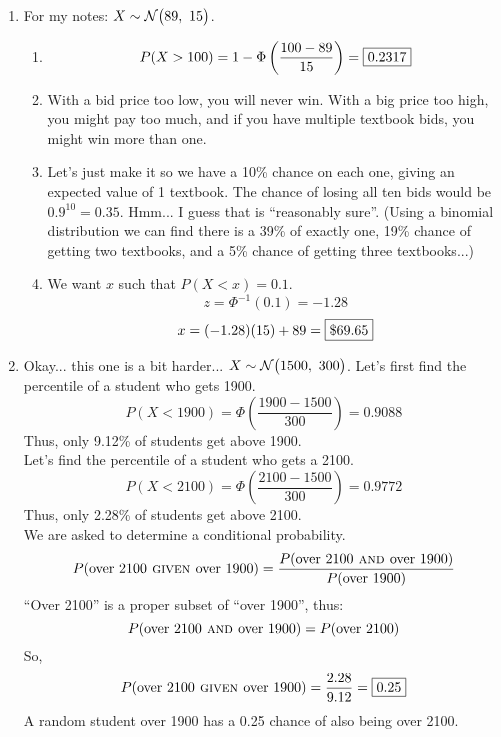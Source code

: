\documentclass[12pt,letterpaper]{article}
\begin{document}
\begin{enumerate}
\item For my notes: $X\sim \mathcal{N}\big(89,~15\big)$.
\begin{enumerate}
\item $$P(X>100) = 1-\Phi\left(\frac{100-89}{15}\right) = \fbox{0.2317} $$
\item With a bid price too low, you will never win. With a big price too high, you might pay too much, and if you have multiple textbook bids, you might win more than one.
\item Let's just make it so we have a 10\% chance on each one, giving an expected value of 1 textbook. The chance of losing all ten bids would be $0.9^{10} = 0.35$. Hmm... I guess that is ``reasonably sure''. (Using a binomial distribution we can find there is a 39\% of exactly one, 19\% chance of getting two textbooks, and a 5\% chance of getting three textbooks...)
\item We want $x$ such that $P(X<x) = 0.1$.
$$z = \Phi^{-1}(0.1) =  -1.28$$
$$x = (-1.28)(15)+89 = \fbox{\$69.65} $$
\end{enumerate}

\item Okay... this one is a bit harder... $X\sim \mathcal{N}\big(1500,~300\big)$. Let's first find the percentile of a student who gets 1900.
$$P(X<1900) = \Phi\left(\frac{1900-1500}{300}\right) = 0.9088$$
Thus, only 9.12\% of students get above 1900.\\
Let's find the percentile of a student who gets a 2100.
$$P(X<2100) = \Phi\left(\frac{2100-1500}{300}\right) = 0.9772$$
Thus, only 2.28\% of students get above 2100.\\
We are asked to determine a conditional probability.
$$P(\text{over 2100} \textsc{~given~} \text{over 1900}) = \frac{P(\text{over 2100} \textsc{~and~} \text{over 1900})}{P(\text{over 1900})} $$
``Over 2100'' is a proper subset of ``over 1900'', thus:
$$P(\text{over 2100} \textsc{~and~} \text{over 1900}) = P(\text{over 2100})$$
So,
$$P(\text{over 2100} \textsc{~given~} \text{over 1900}) = \frac{2.28}{9.12}= \fbox{0.25}$$
A random student over 1900 has a 0.25 chance of also being over 2100.

\end{enumerate}
\end{document}
